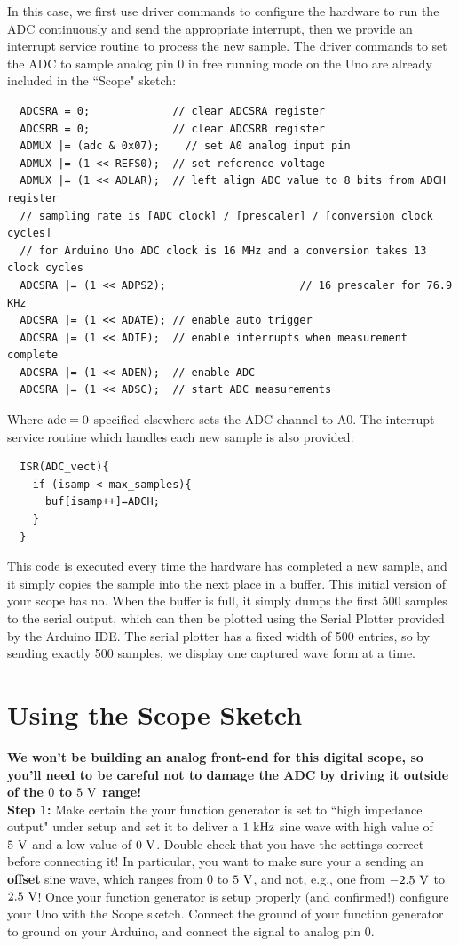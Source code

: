 \documentclass[12pt]{article}
\begin{document}
In this case, we first use driver commands to configure the hardware to run the ADC continuously and send the appropriate interrupt, then we provide an interrupt service routine to process the new sample.
The driver commands to set the ADC to sample analog pin 0 in free running mode on the Uno are already included in the ``Scope" sketch:
 \begin{verbatim}
  ADCSRA = 0;             // clear ADCSRA register
  ADCSRB = 0;             // clear ADCSRB register
  ADMUX |= (adc & 0x07);    // set A0 analog input pin
  ADMUX |= (1 << REFS0);  // set reference voltage
  ADMUX |= (1 << ADLAR);  // left align ADC value to 8 bits from ADCH register
  // sampling rate is [ADC clock] / [prescaler] / [conversion clock cycles]
  // for Arduino Uno ADC clock is 16 MHz and a conversion takes 13 clock cycles
  ADCSRA |= (1 << ADPS2);                     // 16 prescaler for 76.9 KHz
  ADCSRA |= (1 << ADATE); // enable auto trigger
  ADCSRA |= (1 << ADIE);  // enable interrupts when measurement complete
  ADCSRA |= (1 << ADEN);  // enable ADC
  ADCSRA |= (1 << ADSC);  // start ADC measurements
\end{verbatim}
Where $\rm adc=0$ specified elsewhere sets the ADC channel to A0.  The interrupt service routine which handles each new sample is also provided:
\begin{verbatim}
  ISR(ADC_vect){
    if (isamp < max_samples){
      buf[isamp++]=ADCH;
    }
  }    
\end{verbatim}
This code is executed every time the hardware has completed a new sample, and it simply copies the sample into the next place in a buffer.  This initial version of your scope has no. When the buffer is full, it simply dumps the first 500 samples to the serial output, which can then be plotted using the Serial Plotter provided by the Arduino IDE.  The serial plotter has a fixed width of 500 entries, so by sending exactly 500 samples, we display one captured wave form at a time.

\section{Using the Scope Sketch}

{\bf We won't be building an analog front-end for this digital scope, so you'll need to be careful not to damage the ADC by driving it outside of the $0$ to $5~\rm{V}$ range!} \\ 

\noindent
{\bf Step 1:}  Make certain the your function generator is set to ``high impedance output" under setup and set it to deliver a $1~\rm kHz$ sine wave with high value of $5~\rm V$ and a low value of $0~\rm V$.  Double check that you have the settings correct before connecting it!  In particular, you want to make sure your a sending an {\bf offset} sine wave, which ranges from $0$ to $5~\rm V$, and not, e.g., one from $-2.5~\rm V$ to $2.5~\rm V$!   Once your function generator is setup properly (and confirmed!) configure your Uno with the Scope sketch.  Connect the ground of your function generator to ground on your Arduino, and connect the signal to analog pin 0.\\
\end{document}
